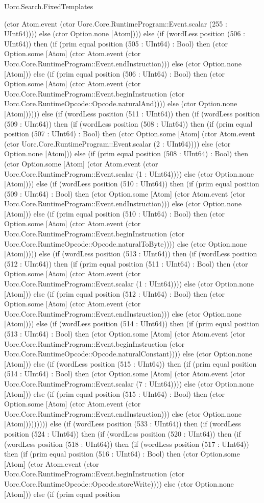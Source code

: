 \begin{lexlean}{Uorc.Search.FixedTemplates}
\begin{semanticmodule}
{(ctor Atom.event (ctor Uorc.Core.RuntimeProgram::Event.scalar (255 : UInt64)))) else (ctor Option.none [Atom]))) else (if (wordLess position (506 : UInt64)) then (if (prim equal position (505 : UInt64) : Bool) then (ctor Option.some [Atom] (ctor Atom.event (ctor Uorc.Core.RuntimeProgram::Event.endInstruction))) else (ctor Option.none [Atom])) else (if (prim equal position (506 : UInt64) : Bool) then (ctor Option.some [Atom] (ctor Atom.event (ctor Uorc.Core.RuntimeProgram::Event.beginInstruction (ctor Uorc.Core.RuntimeOpcode::Opcode.naturalAnd)))) else (ctor Option.none [Atom]))))) else (if (wordLess position (511 : UInt64)) then (if (wordLess position (509 : UInt64)) then (if (wordLess position (508 : UInt64)) then (if (prim equal position (507 : UInt64) : Bool) then (ctor Option.some [Atom] (ctor Atom.event (ctor Uorc.Core.RuntimeProgram::Event.scalar (2 : UInt64)))) else (ctor Option.none [Atom])) else (if (prim equal position (508 : UInt64) : Bool) then (ctor Option.some [Atom] (ctor Atom.event (ctor Uorc.Core.RuntimeProgram::Event.scalar (1 : UInt64)))) else (ctor Option.none [Atom]))) else (if (wordLess position (510 : UInt64)) then (if (prim equal position (509 : UInt64) : Bool) then (ctor Option.some [Atom] (ctor Atom.event (ctor Uorc.Core.RuntimeProgram::Event.endInstruction))) else (ctor Option.none [Atom])) else (if (prim equal position (510 : UInt64) : Bool) then (ctor Option.some [Atom] (ctor Atom.event (ctor Uorc.Core.RuntimeProgram::Event.beginInstruction (ctor Uorc.Core.RuntimeOpcode::Opcode.naturalToByte)))) else (ctor Option.none [Atom])))) else (if (wordLess position (513 : UInt64)) then (if (wordLess position (512 : UInt64)) then (if (prim equal position (511 : UInt64) : Bool) then (ctor Option.some [Atom] (ctor Atom.event (ctor Uorc.Core.RuntimeProgram::Event.scalar (1 : UInt64)))) else (ctor Option.none [Atom])) else (if (prim equal position (512 : UInt64) : Bool) then (ctor Option.some [Atom] (ctor Atom.event (ctor Uorc.Core.RuntimeProgram::Event.endInstruction))) else (ctor Option.none [Atom]))) else (if (wordLess position (514 : UInt64)) then (if (prim equal position (513 : UInt64) : Bool) then (ctor Option.some [Atom] (ctor Atom.event (ctor Uorc.Core.RuntimeProgram::Event.beginInstruction (ctor Uorc.Core.RuntimeOpcode::Opcode.naturalConstant)))) else (ctor Option.none [Atom])) else (if (wordLess position (515 : UInt64)) then (if (prim equal position (514 : UInt64) : Bool) then (ctor Option.some [Atom] (ctor Atom.event (ctor Uorc.Core.RuntimeProgram::Event.scalar (7 : UInt64)))) else (ctor Option.none [Atom])) else (if (prim equal position (515 : UInt64) : Bool) then (ctor Option.some [Atom] (ctor Atom.event (ctor Uorc.Core.RuntimeProgram::Event.endInstruction))) else (ctor Option.none [Atom])))))))) else (if (wordLess position (533 : UInt64)) then (if (wordLess position (524 : UInt64)) then (if (wordLess position (520 : UInt64)) then (if (wordLess position (518 : UInt64)) then (if (wordLess position (517 : UInt64)) then (if (prim equal position (516 : UInt64) : Bool) then (ctor Option.some [Atom] (ctor Atom.event (ctor Uorc.Core.RuntimeProgram::Event.beginInstruction (ctor Uorc.Core.RuntimeOpcode::Opcode.storeWrite)))) else (ctor Option.none [Atom])) else (if (prim equal position }
\end{semanticmodule}
\end{lexlean}
